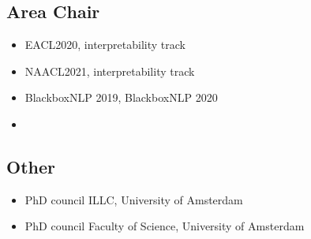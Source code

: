 \subsection{Area Chair}
\begin{itemize}
    \item EACL2020, interpretability track
    \item NAACL2021, interpretability track
    \item BlackboxNLP 2019, BlackboxNLP 2020
    \item[]
\end{itemize}

\subsection{Other}
\begin{itemize}
    \item PhD council ILLC, University of Amsterdam
    \item PhD council Faculty of Science, University of Amsterdam
\end{itemize}

